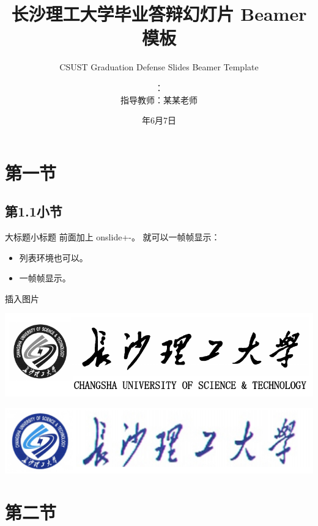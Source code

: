 \documentclass[dvipsnames, svgnames, x11names]{beamer}
\title{长沙理工大学毕业答辩幻灯片 Beamer 模板}
\subtitle{CSUST Graduation Defense Slides Beamer Template}
\author[你的名字]{\makebox[4em][s]{演讲人}：\makebox[4em][l]{你的名字}\\ 指导教师：某某老师}
\institute[长沙理工大学计算机与通信工程学院]{长沙理工大学计算机与通信工程学院\\ 软件工程18-x班}
\date{\the\year 年6月7日}
\begin{document}
\begin{frame}[plain]
    \titlepage
\end{frame}

\begin{frame}[plain]
    \tableofcontents[sectionstyle=show,subsectionstyle=show/shaded/hide,subsubsectionstyle=show/shaded/hide]
\end{frame}

\section{第一节}
\subsection{第1.1小节}
\begin{frame}{大标题}{小标题}
    \onslide<+-> 前面加上 onslide+-。
    \onslide<+-> 就可以一帧帧显示：
    \begin{itemize}[<+->]
        \item 列表环境也可以。
        \item 一帧帧显示。
    \end{itemize}
\end{frame}

\begin{frame}
    插入图片
    \begin{center}
        \includegraphics[scale=.5]{figure/csust_logo_and_name_as_example.pdf}
    \end{center}
    \begin{center}
        \includegraphics[scale=.5]{figure/csust_logo_and_name2_as_example.pdf}
    \end{center}
\end{frame}

\section{第二节}
\end{document}

